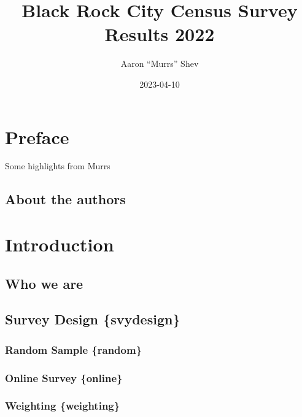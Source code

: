 \documentclass[
]{book}
\title{Black Rock City Census Survey Results 2022}
\author{Aaron ``Murrs'' Shev}
\date{2023-04-10}
\begin{document}
\maketitle

{
\setcounter{tocdepth}{1}
\tableofcontents
}
\hypertarget{preface}{%
\chapter*{Preface}\label{preface}}

Some highlights from Murrs

\hypertarget{about-the-authors}{%
\section*{About the authors}\label{about-the-authors}}

\hypertarget{intro}{%
\chapter{Introduction}\label{intro}}

\hypertarget{whoweare}{%
\section{Who we are}\label{whoweare}}

\hypertarget{survey-design-svydesign}{%
\section{Survey Design \{svydesign\}}\label{survey-design-svydesign}}

\hypertarget{random-sample-random}{%
\subsection{Random Sample \{random\}}\label{random-sample-random}}

\hypertarget{online-survey-online}{%
\subsection{Online Survey \{online\}}\label{online-survey-online}}

\hypertarget{weighting-weighting}{%
\subsection{Weighting \{weighting\}}\label{weighting-weighting}}
\end{document}
